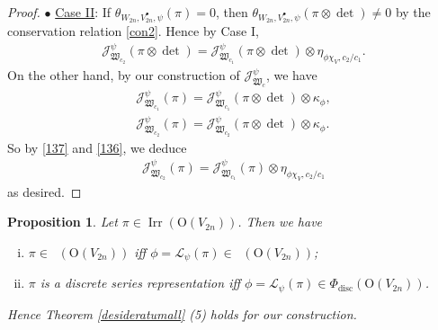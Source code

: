 \documentclass[article]{article}
\numberwithin{equation}{section}
\newtheorem{proposition}[theorem]{Proposition}
\theoremstyle{definition}
\DeclareMathOperator{\Irr}{Irr}
\DeclareMathOperator{\Irrt}{Irr_{temp}}
\DeclareMathOperator{\Para}{\Phi_{temp}}
\DeclareMathOperator{\disc}{disc}
\begin{document}
\begin{proof}
	$\bullet$ \underline{Case II}: If $\theta_{W_{2n},V_{2n}^\bullet, \psi}(\pi)=0$, then $\theta_{W_{2n},V_{2n}^\bullet, \psi}(\pi\otimes\det)\neq 0$ by the conservation relation \ref{con2}. Hence by Case I, 
	\begin{align}\label{137}
	\mathcal J^\psi_{\mathfrak W_{c_2}}(\pi\otimes\det)=\mathcal J^\psi_{\mathfrak W_{c_1}}(\pi\otimes
	\det)\otimes\eta_{\phi\chi_{V},c_2/c_1}. 
	\end{align}
	On the other hand, by our construction of $\mathcal J^\psi_{\mathfrak W_{c}}$, we have 
	\begin{equation}\label{136}
	\begin{aligned}
	\mathcal J^\psi_{\mathfrak W_{c_1}}(\pi)=\mathcal J^\psi_{\mathfrak W_{c_1}}(\pi\otimes\det)\otimes\kappa_{\phi},\\
	\mathcal J^\psi_{\mathfrak W_{c_2}}(\pi)=\mathcal J^\psi_{\mathfrak W_{c_2}}(\pi\otimes\det)\otimes\kappa_{\phi}. 
	\end{aligned}
	\end{equation} 
	 So by \ref{137} and \ref{136}, we deduce  
	\begin{align*}
	\mathcal J^\psi_{\mathfrak W_{c_2}}(\pi)=\mathcal J^\psi_{\mathfrak W_{c_1}}(\pi)\otimes\eta_{\phi\chi_{V},c_2/c_1}
	\end{align*}
	as desired. 
\end{proof}
\begin{proposition}\label{tempered}
	Let $\pi\in \Irr(\mathrm O(V_{2n}))$. Then we have  
	\begin{enumerate}[(i)]
		\item $\pi\in \Irrt(\mathrm O(V_{2n}))$ iff $\phi=\mathcal L_\psi(\pi)\in \Para(\mathrm O(V_{2n}))$; 
		\item $\pi$ is a discrete series representation iff $\phi=\mathcal L_\psi(\pi)\in \Phi_{\disc}(\mathrm O(V_{2n}))$. 
	\end{enumerate} 
Hence Theorem \ref{desideratumall} (5) holds for our construction.
\end{proposition}
\end{document}
